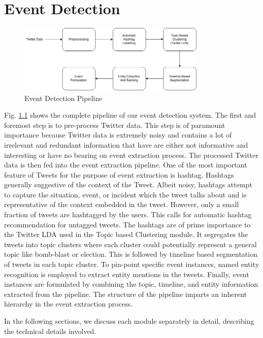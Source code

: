 \chapter{Event Detection}

\begin{figure} 
    \centering 
    \includegraphics[width=0.8\textwidth]{Detection1.png} 
    \caption{Event Detection Pipeline} 
    \label{fig:pipeline}
\end{figure}

Fig. \ref{fig:pipeline} shows the complete pipeline of our event detection system. The first and foremost step is to pre-process Twitter data. This step is of paramount importance because Twitter data is extremely noisy and contains a lot of irrelevant and redundant information that have are either not informative and interesting or have no bearing on event extraction process. The processed Twitter data is then fed into the event extraction pipeline. One of the most important feature of Tweets for the purpose of event extraction is hashtag. Hashtags generally suggestive of the context of the Tweet. Albeit noisy, hashtags attempt to capture the situation, event, or incident which the tweet talks about and is representative of the context embedded in the tweet. However, only a small fraction of tweets are hashtagged by the users. This calls for automatic hashtag recommendation for untagged tweets. The hashtags are of prime importance to the Twitter LDA used in the Topic based Clustering module. It segregates the tweets into topic clusters where each cluster could potentially represent a general topic like bomb-blast or election. This is followed by timeline based segmentation of tweets in each topic cluster. To pin-point specific event instances, named entity recognition is employed to extract entity mentions in the tweets. Finally, event instances are formulated by combining the topic, timeline, and entity information extracted from the pipeline. The structure of the pipeline imparts an inherent hierarchy in the event extraction process.

In the following sections, we discuss each module separately in detail, describing the technical details involved.

